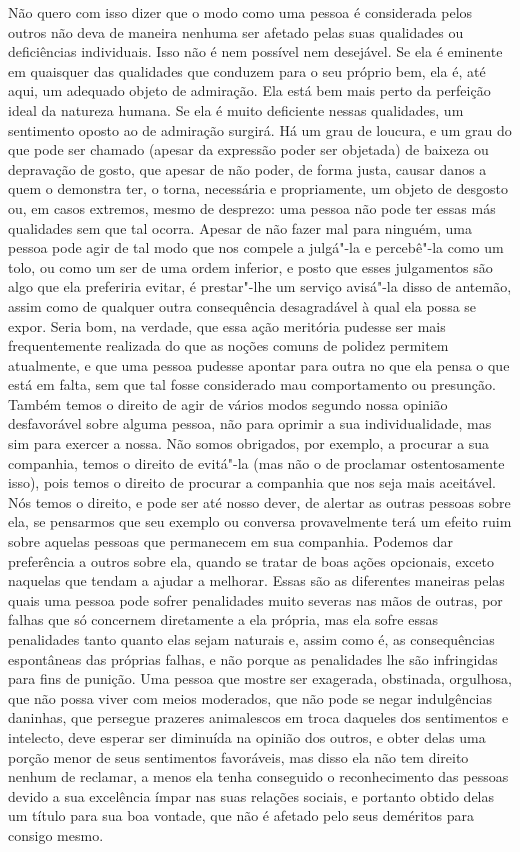 Não quero com isso dizer que o modo como uma pessoa é
considerada pelos outros não deva de maneira nenhuma ser afetado pelas suas
qualidades ou deficiências individuais. Isso não é nem possível nem
desejável. Se ela é eminente em quaisquer das qualidades que conduzem
para o seu próprio bem, ela é, até aqui, um adequado objeto de admiração.
Ela está bem mais perto da perfeição ideal da natureza humana. Se
ela é muito deficiente nessas qualidades, um sentimento oposto ao de
admiração surgirá. Há um grau de loucura, e um grau do que pode ser
chamado (apesar da expressão poder ser objetada) de baixeza ou
depravação de gosto, que apesar de não poder, de forma justa, causar
danos a quem o demonstra ter, o torna, necessária e propriamente, um
objeto de desgosto ou, em casos extremos, mesmo de desprezo: uma pessoa
não pode ter essas más qualidades sem que tal ocorra. Apesar de não
fazer mal para ninguém, uma pessoa pode agir de tal modo que nos
compele a julgá"-la e percebê"-la como um tolo, ou como
um ser de uma ordem inferior, e posto que esses julgamentos são algo
que ela preferiria evitar, é prestar"-lhe um serviço avisá"-la disso
de antemão, assim como de qualquer outra consequência desagradável à
qual ela possa se expor. Seria bom, na verdade, que essa ação meritória
pudesse ser mais frequentemente realizada do que as noções comuns de
polidez permitem atualmente, e que uma pessoa pudesse apontar para
outra no que ela pensa o que está em falta, sem que tal fosse
considerado mau comportamento ou presunção. Também temos o direito de agir 
de vários modos segundo nossa opinião desfavorável
sobre alguma pessoa, não para oprimir a sua individualidade, mas sim
para exercer a nossa. Não somos obrigados, por exemplo, a procurar a
sua companhia, temos o direito de evitá"-la (mas não o de proclamar
ostentosamente isso), pois temos o direito de procurar a companhia que
nos seja mais aceitável. Nós temos o direito, e pode ser até nosso
dever, de alertar as outras pessoas sobre ela, se pensarmos que seu
exemplo ou conversa provavelmente terá um efeito ruim sobre aquelas
pessoas que permanecem em sua companhia. Podemos dar preferência a
outros sobre ela, quando se tratar de boas ações opcionais, exceto
naquelas que tendam a ajudar a melhorar. Essas são as diferentes
maneiras pelas quais uma pessoa pode sofrer penalidades muito severas
nas mãos de outras, por falhas que só concernem diretamente a ela
própria, mas ela sofre essas penalidades tanto quanto elas sejam
naturais e, assim como é, as consequências espontâneas das próprias
falhas, e não porque as penalidades lhe são infringidas para fins de
punição. Uma pessoa que mostre ser exagerada, obstinada, orgulhosa,
que não possa viver com meios moderados, que não pode se negar
indulgências daninhas, que persegue prazeres animalescos em troca
daqueles dos sentimentos e intelecto, deve esperar ser diminuída na
opinião dos outros, e obter delas uma porção menor de seus sentimentos
favoráveis, mas disso ela não tem direito nenhum de reclamar, a menos
ela tenha conseguido o reconhecimento das pessoas devido a sua
excelência ímpar nas suas relações sociais, e portanto obtido delas um título
para sua boa vontade, que não é afetado pelo seus deméritos para
consigo mesmo. 

